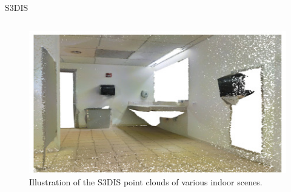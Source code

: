 \documentclass[aspectratio=169]{beamer}
\begin{document}
\begin{frame}{S3DIS}
\begin{columns}
\begin{column}{0.4\textwidth}
\begin{figure}
                \includegraphics[scale=0.35]{images/s3dis/s3dis_sample_2.jpg}
                \caption{Illustration of the S3DIS point clouds of various indoor scenes.}
                \label{fig:s3dis_sample_images}
            \end{figure}
        \end{column}
    \end{columns}
\end{frame}
\end{document}
